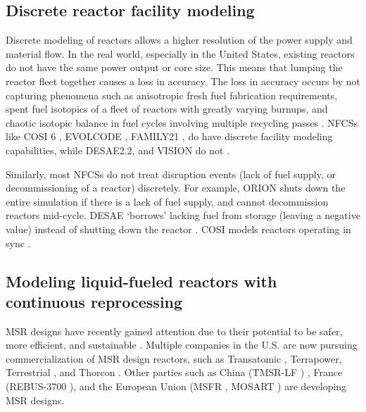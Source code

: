 \subsection{Discrete reactor facility modeling}
Discrete modeling of reactors allows a higher resolution of the power supply and
material flow. In the real world, especially in the United States, existing
reactors do not have the same power output or core size. This means that
lumping the reactor fleet together causes a loss in accuracy. The loss in
accuracy occurs by not capturing phenomena such as anisotropic fresh fuel
fabrication requirements, spent fuel isotopics of a fleet of reactors
with greatly varying burnups, and chaotic isotopic balance in fuel
cycles involving multiple recycling passes \cite{huff_next_2010}.
\glspl{NFCS} like COSI 6 \cite{meyer_new_2009}, EVOLCODE \cite{alvarez-velarde_validation_2014},
FAMILY21 \cite{oecd_nuclear_2009},
do have discrete facility modeling capabilities, while
DESAE2.2\cite{tsibulskiy_desae_2006}, and VISION \cite{jacobson_verifiable_2010} do
not \cite{boucher_international_2010}.

Similarly, most \glspl{NFCS} do not treat disruption events (lack of fuel supply,
or decommissioning of a reactor)
discretely. For example, ORION shuts down the entire simulation if there
is a lack of fuel supply, and cannot decommission reactors mid-cycle.
DESAE `borrows' lacking fuel from storage (leaving a
negative value) instead of shutting down the reactor \cite{mccarthy_benchmark_2012}.
COSI models reactors operating in sync \cite{boucher_benchmark_2012}.


\subsection{Modeling liquid-fueled reactors with continuous reprocessing}
\label{sec:msr}
\gls{MSR} designs have recently gained attention due to 
their potential to be 
safer, more efficient, and sustainable \cite{serp_molten_2014}.
Multiple companies in the U.S. are now pursuing
commercialization of \gls{MSR} design reactors, such as Transatomic \cite{transatomic_power_corporation_technical_2016}
, Terrapower, Terrestrial \cite{leblanc_18_2017}, and
Thorcon \cite{jorgensen_19_2017}. Other parties such as China (TMSR-LF \cite{dai_17_2017}) ,
France (REBUS-3700 \cite{mourogov_potentialities_2006}),
and the European Union (MSFR \cite{heuer_towards_2014}, MOSART \cite{ignatiev_molten_2014})
are developing \gls{MSR} designs.

